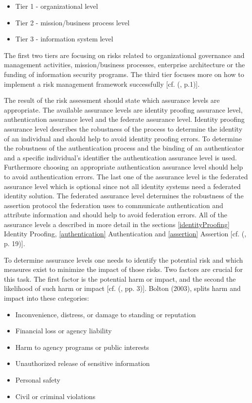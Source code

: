 \begin{itemize}
	\item Tier 1 - organizational level
	\item Tier 2 - mission/business process level
	\item Tier 3 - information system level
\end{itemize}

The first two tiers are focusing on risks related to organizational governance and management activities, mission/business processes, enterprise architecture or the funding of information security programs. The third tier focuses more on how to implement a risk management framework successfully [cf. (\cite{NIST:2012:GCRA}, p.1)]. 

The result of the risk assessment should state which assurance levels are appropriate. The available assurance levels are identity proofing assurance level, authentication assurance level and the federate assurance level. Identity proofing assurance level describes the robustness of the process to determine the identity of an individual and should help to avoid identity proofing errors. To determine the robustness of the authentication process and the binding of an authenticator and a specific individual's identifier the authentication assurance level is used. Furthermore choosing an appropriate authentication assurance level should help to avoid authentication errors. The last one of the assurance level is the federated assurance level which is optional since not all identity systems need a federated identity solution. The federated assurance level determines the robustness of the assertion protocol the federation uses to communicate authentication and attribute information and should help to avoid federation errors. All of the assurance levels a described in more detail in the sections \ref{identityProofing} Identity Proofing, \ref{authentication} Authentication and \ref{assertion} Assertion [cf. (\cite{NIST:2017:DIG}, p. 19)]. 

To determine assurance levels one needs to identify the potential risk and which measures exist to minimize the impact of those risks. Two factors are crucial for this task. The first factor is the potential harm or impact, and the second the likelihood of such harm or impact [cf. (\cite{Bolton:2003:EAuth}, pp. 3)]. Bolton (2003), splits harm and impact into these categories:

\begin{itemize}
	\item Inconvenience, distress, or damage to standing or reputation
	\item Financial loss or agency liability
	\item Harm to agency programs or public interests
	\item Unauthorized release of sensitive information
	\item Personal safety
	\item Civil or criminal violations
\end{itemize}

